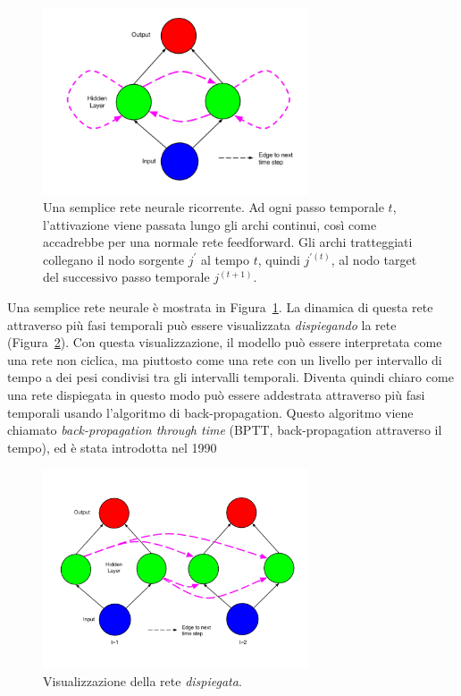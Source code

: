 \begin{figure}[tp]
  \centering
  \begin{center}
    \includegraphics[width=0.7\textwidth]{./images/simpleRecurrentNeuralNetwork.png}
  \end{center}
  \caption{Una semplice rete neurale ricorrente.
  Ad ogni passo temporale $t$, l'attivazione viene passata lungo gli archi continui, cos\`i come accadrebbe per una normale rete feedforward.
  Gli archi tratteggiati collegano il nodo sorgente $j^{'}$ al tempo $t$, quindi $j^{'(t)}$, al nodo target del successivo passo temporale $j^{(t+1)}$.}
  \label{fig:simpleRecurrentNeuralNetwork}
\end{figure}

Una semplice rete neurale \`e mostrata in Figura~\ref{fig:simpleRecurrentNeuralNetwork}.
La dinamica di questa rete attraverso pi\`u fasi temporali pu\`o essere visualizzata \emph{dispiegando} la rete (Figura~\ref{fig:unfoldedSimpleRecurrentNeuralNetwork}).
Con questa visualizzazione, il modello pu\`o essere interpretata come una rete non ciclica, ma piuttosto come una rete con un livello per intervallo di tempo a dei pesi condivisi tra gli intervalli temporali.
Diventa quindi chiaro come una rete dispiegata in questo modo pu\`o essere addestrata attraverso pi\`u fasi temporali usando l'algoritmo di back-propagation.
Questo algoritmo viene chiamato \emph{back-propagation through time} (BPTT, back-propagation attraverso il tempo), ed \`e stata introdotta nel 1990~\cite{Werbos:1990}

\begin{figure}[tp]
  \centering
  \begin{center}
    \includegraphics[width=0.7\textwidth]{./images/unfoldedSimpleRecurrentNeuralNetwork.png}
  \end{center}
  \caption{Visualizzazione della rete \emph{dispiegata}.}
  \label{fig:unfoldedSimpleRecurrentNeuralNetwork}
\end{figure}

